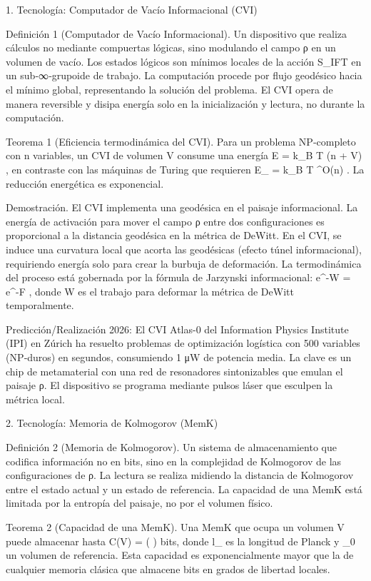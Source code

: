 \documentclass[12pt,a4paper]{book}
\begin{document}
1. Tecnología: Computador de Vacío Informacional (CVI)

Definición 1 (Computador de Vacío Informacional). Un dispositivo que realiza cálculos no mediante compuertas lógicas, sino modulando el campo ρ en un volumen de vacío. Los estados lógicos son mínimos locales de la acción S_IFT en un sub‑∞‑grupoide de trabajo. La computación procede por flujo geodésico hacia el mínimo global, representando la solución del problema. El CVI opera de manera reversible y disipa energía solo en la inicialización y lectura, no durante la computación.

Teorema 1 (Eficiencia termodinámica del CVI). Para un problema NP‑completo con n variables, un CVI de volumen V consume una energía  E = k_B T  \cdot (n + \log V) , en contraste con las máquinas de Turing que requieren  E_{} = k_B T  ^{O(n)} . La reducción energética es exponencial.

Demostración. El CVI implementa una geodésica en el paisaje informacional. La energía de activación para mover el campo ρ entre dos configuraciones es proporcional a la distancia geodésica en la métrica de DeWitt. En el CVI, se induce una curvatura local que acorta las geodésicas (efecto túnel informacional), requiriendo energía solo para crear la burbuja de deformación. La termodinámica del proceso está gobernada por la fórmula de Jarzynski informacional:  \langle e^{-\beta W} \rangle = e^{-\beta \Delta F} , donde W es el trabajo para deformar la métrica de DeWitt temporalmente. 

Predicción/Realización 2026: El CVI Atlas-0 del Information Physics Institute (IPI) en Zúrich ha resuelto problemas de optimización logística con 500 variables (NP‑duros) en segundos, consumiendo 1 μW de potencia media. La clave es un chip de metamaterial con una red de resonadores sintonizables que emulan el paisaje ρ. El dispositivo se programa mediante pulsos láser que esculpen la métrica local.

2. Tecnología: Memoria de Kolmogorov (MemK)

Definición 2 (Memoria de Kolmogorov). Un sistema de almacenamiento que codifica información no en bits, sino en la complejidad de Kolmogorov de las configuraciones de ρ. La lectura se realiza midiendo la distancia de Kolmogorov entre el estado actual y un estado de referencia. La capacidad de una MemK está limitada por la entropía del paisaje, no por el volumen físico.

Teorema 2 (Capacidad de una MemK). Una MemK que ocupa un volumen V puede almacenar hasta  C(V) =  \ln\left(  \right)  bits, donde  l_{}  es la longitud de Planck y  _0  un volumen de referencia. Esta capacidad es exponencialmente mayor que la de cualquier memoria clásica que almacene bits en grados de libertad locales.
\end{document}
